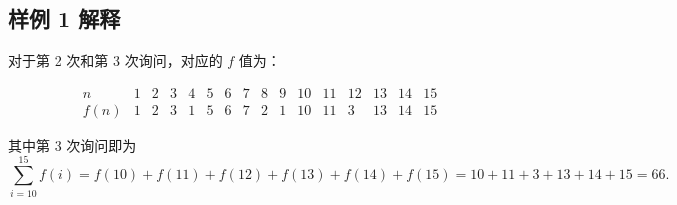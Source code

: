 \subsection{样例 1 解释}

对于第 2 次和第 3 次询问，对应的 $f$ 值为：

\[
\begin{array}{c|ccccccccccccccc}
n
&1&2&3&4&5&6&7&8&9&10&11&12&13&14&15\\
\hline
f(n)
&1&2&3&1&5&6&7&2&1&10&11&3&13&14&15
\end{array}
\]

其中第 3 次询问即为
\[
	\sum_{i = 10}^{15}f(i) = f(10) + f(11) + f(12) + f(13) + f(14) + f(15) = 10 + 11 + 3 + 13 + 14 + 15 = 66.
\]



